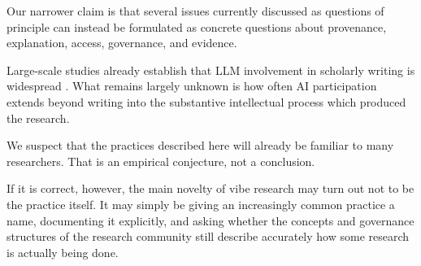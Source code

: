 Our narrower claim is that several issues currently discussed as questions of principle can instead be formulated as concrete questions about provenance, explanation, access, governance, and evidence.

Large-scale studies already establish that LLM involvement in scholarly writing is widespread \citep{liangEtAl2024mapping,kobakEtAl2024biomedical,gray2025prevalence}. What remains largely unknown is how often AI participation extends beyond writing into the substantive intellectual process which produced the research.

We suspect that the practices described here will already be familiar to many researchers. That is an empirical conjecture, not a conclusion.

If it is correct, however, the main novelty of vibe research may turn out not to be the practice itself. It may simply be giving an increasingly common practice a name, documenting it explicitly, and asking whether the concepts and governance structures of the research community still describe accurately how some research is actually being done.

